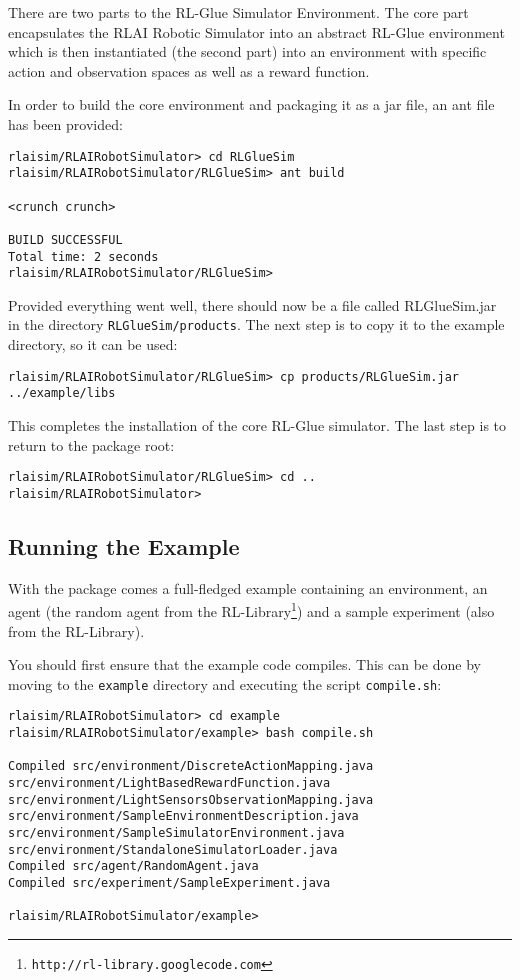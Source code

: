 \documentclass[12pt]{article}
\newcommand{\code}[1]{\texttt{#1}}
\begin{document}
There are two parts to the RL-Glue Simulator Environment. The core part
encapsulates the RLAI Robotic Simulator into an abstract RL-Glue environment
which is then instantiated (the second part) into an environment with specific
action and observation spaces as well as a reward function.

In order to build the core environment and packaging it as a jar file, an
ant file has been provided:

\begin{verbatim}
rlaisim/RLAIRobotSimulator> cd RLGlueSim
rlaisim/RLAIRobotSimulator/RLGlueSim> ant build 

<crunch crunch>

BUILD SUCCESSFUL
Total time: 2 seconds
rlaisim/RLAIRobotSimulator/RLGlueSim>

\end{verbatim}

Provided everything went well, there should now be a file called RLGlueSim.jar
in the directory \code{RLGlueSim/products}. The next step is to copy it to
the example directory, so it can be used:

\begin{verbatim}
rlaisim/RLAIRobotSimulator/RLGlueSim> cp products/RLGlueSim.jar ../example/libs
\end{verbatim}

This completes the installation of the core RL-Glue simulator. The last
step is to return to the package root:

\begin{verbatim}
rlaisim/RLAIRobotSimulator/RLGlueSim> cd ..
rlaisim/RLAIRobotSimulator>
\end{verbatim}

\subsection{Running the Example}

With the package comes a full-fledged example containing an environment,
an agent (the random agent from the 
RL-Library\footnote{\code{http://rl-library.googlecode.com}}) and a 
sample experiment (also from the RL-Library). 

You should first ensure that the example code compiles. This can be done
by moving to the \code{example} directory and executing the script
\code{compile.sh}:

\begin{verbatim}
rlaisim/RLAIRobotSimulator> cd example
rlaisim/RLAIRobotSimulator/example> bash compile.sh

Compiled src/environment/DiscreteActionMapping.java src/environment/LightBasedRewardFunction.java src/environment/LightSensorsObservationMapping.java src/environment/SampleEnvironmentDescription.java src/environment/SampleSimulatorEnvironment.java src/environment/StandaloneSimulatorLoader.java
Compiled src/agent/RandomAgent.java
Compiled src/experiment/SampleExperiment.java

rlaisim/RLAIRobotSimulator/example>
\end{verbatim}
\end{document}
